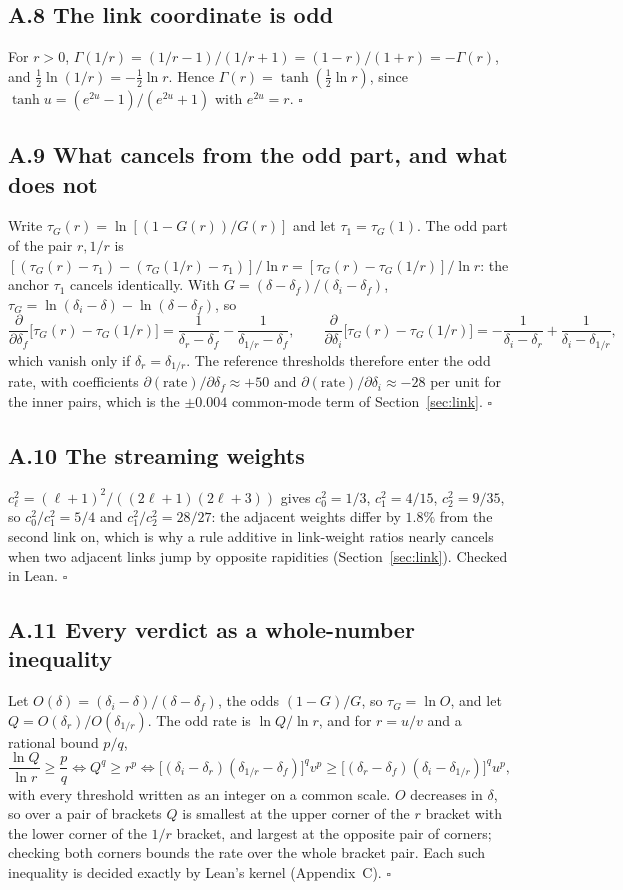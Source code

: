 \documentclass[11pt]{article}
\begin{document}
\subsection*{A.8 The link coordinate is odd}
For $r>0$, $\Gamma(1/r)=(1/r-1)/(1/r+1)=(1-r)/(1+r)=-\Gamma(r)$, and $\tfrac12\ln(1/r)=-\tfrac12\ln r$. Hence $\Gamma(r)=\tanh(\tfrac12\ln r)$, since $\tanh u=(e^{2u}-1)/(e^{2u}+1)$ with $e^{2u}=r$. $\square$

\subsection*{A.9 What cancels from the odd part, and what does not}
Write $\tau_G(r)=\ln[(1-G(r))/G(r)]$ and let $\tau_1=\tau_G(1)$. The odd part of the pair $r,1/r$ is $[(\tau_G(r)-\tau_1)-(\tau_G(1/r)-\tau_1)]/\ln r=[\tau_G(r)-\tau_G(1/r)]/\ln r$: the anchor $\tau_1$ cancels identically. With $G=(\delta-\delta_f)/(\delta_i-\delta_f)$, $\tau_G=\ln(\delta_i-\delta)-\ln(\delta-\delta_f)$, so
\[
\frac{\partial}{\partial\delta_f}\big[\tau_G(r)-\tau_G(1/r)\big]=\frac1{\delta_r-\delta_f}-\frac1{\delta_{1/r}-\delta_f},\qquad
\frac{\partial}{\partial\delta_i}\big[\tau_G(r)-\tau_G(1/r)\big]=-\frac1{\delta_i-\delta_r}+\frac1{\delta_i-\delta_{1/r}},
\]
which vanish only if $\delta_r=\delta_{1/r}$. The reference thresholds therefore enter the odd rate, with coefficients $\partial(\text{rate})/\partial\delta_f\approx+50$ and $\partial(\text{rate})/\partial\delta_i\approx-28$ per unit for the inner pairs, which is the $\pm0.004$ common-mode term of Section~\ref{sec:link}. $\square$

\subsection*{A.10 The streaming weights}
$c_\ell^2=(\ell+1)^2/((2\ell+1)(2\ell+3))$ gives $c_0^2=1/3$, $c_1^2=4/15$, $c_2^2=9/35$, so $c_0^2/c_1^2=5/4$ and $c_1^2/c_2^2=28/27$: the adjacent weights differ by $1.8\%$ from the second link on, which is why a rule additive in link-weight ratios nearly cancels when two adjacent links jump by opposite rapidities (Section~\ref{sec:link}). Checked in Lean. $\square$

\subsection*{A.11 Every verdict as a whole-number inequality}
Let $O(\delta)=(\delta_i-\delta)/(\delta-\delta_f)$, the odds $(1-G)/G$, so $\tau_G=\ln O$, and let $Q=O(\delta_r)/O(\delta_{1/r})$. The odd rate is $\ln Q/\ln r$, and for $r=u/v$ and a rational bound $p/q$,
\[
\frac{\ln Q}{\ln r}\ge\frac pq\iff Q^q\ge r^p\iff \big[(\delta_i-\delta_r)(\delta_{1/r}-\delta_f)\big]^q v^p\ge\big[(\delta_r-\delta_f)(\delta_i-\delta_{1/r})\big]^q u^p ,
\]
with every threshold written as an integer on a common scale. $O$ decreases in $\delta$, so over a pair of brackets $Q$ is smallest at the upper corner of the $r$ bracket with the lower corner of the $1/r$ bracket, and largest at the opposite pair of corners; checking both corners bounds the rate over the whole bracket pair. Each such inequality is decided exactly by Lean's kernel (Appendix~C). $\square$
\end{document}
